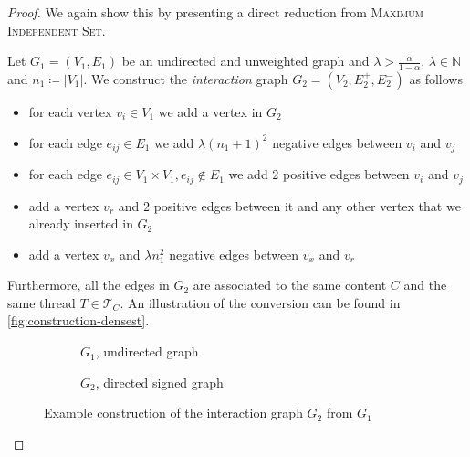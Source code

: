 \begin{proof}
	We again show this by presenting a direct reduction from \textsc{Maximum
		Independent Set}.

	\bigskip
	Let $G_{1}  = (V_{1} ,E_{1} )$ be an undirected and unweighted graph and
	$\lambda > \frac{\alpha }{1 - \alpha }$, $\lambda \in \mathbb{N} $ and $n_{1} \coloneqq |V_{1}| $.
	We construct the \emph{interaction} graph ${G}_{2}  = (V_{2} , E^{+}_{2} , E
			^{-}_{2} ) $ as follows

	\begin{itemize}
		\item for each vertex $v_{i}  \in V_{1} $ we add a vertex in $G_{2} $
		\item for each edge $e_{ij}  \in
			      E_{1} $ we add $\lambda (n_{1}+1)^{2}  $ negative edges between $v_{i} $ and $v_{j} $
		\item for each edge $e_{ij} \in V_1 \times V_1, e_{ij} \not\in
			      E_{1} $ we add $2$ positive edges between $v_{i} $ and $v_{j} $
		\item add a vertex $v_r$ and $2$ positive edges between it and any other
		      vertex that we already inserted in $G_2$
		\item add a vertex $v_x$ and $\lambda n_{1}^{2}  $ negative edges between $v_x$
		      and $v_{r} $
	\end{itemize}

	Furthermore, all the edges in $G_{2} $ are associated to the same content
	$C$ and the same thread $T \in \mathcal{T}_{C}  $.
	An illustration of the conversion can be found in
	\autoref{fig:construction-densest}.

	\begin{figure}
		\begin{center}
			\begin{subfigure}[b]{0.4\textwidth}
				\centering
				\vspace{30pt}
				\caption{$G_{1}$, undirected graph}
				\label{fig:g1_example}
			\end{subfigure}
			\begin{subfigure}[b]{0.4\textwidth}
				\centering
				\caption{$G_{2}$, directed signed graph}
				\label{fig:g2_example}
			\end{subfigure}
		\end{center}
		\caption[Example reduction from MIP to \acrshort{D-ECP}]{Example construction of the interaction graph $G_{2} $ from
			$G_{1} $}
		\label{fig:construction-densest}
	\end{figure}


\end{proof}
